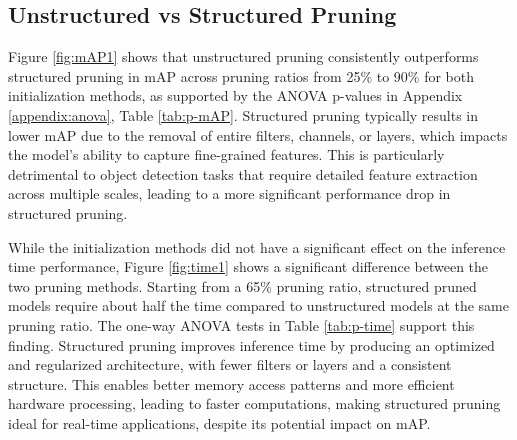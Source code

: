\documentclass[10pt]{cai}
\begin{document}
\subsection{Unstructured vs Structured Pruning}
\label{sec2}
Figure \ref{fig:mAP1} shows that unstructured pruning consistently outperforms structured pruning in mAP across pruning ratios from 25\% to 90\% for both initialization methods, as supported by the ANOVA p-values in Appendix \ref{appendix:anova}, Table \ref{tab:p-mAP}. Structured pruning typically results in lower mAP due to the removal of entire filters, channels, or layers, which impacts the model’s ability to capture fine-grained features. This is particularly detrimental to object detection tasks that require detailed feature extraction across multiple scales, leading to a more significant performance drop in structured pruning.

While the initialization methods did not have a significant effect on the inference time performance, Figure \ref{fig:time1} shows a significant difference between the two pruning methods. Starting from a 65\% pruning ratio, structured pruned models require about half the time compared to unstructured models at the same pruning ratio. The one-way ANOVA tests in Table \ref{tab:p-time} support this finding. Structured pruning improves inference time by producing an optimized and regularized architecture, with fewer filters or layers and a consistent structure. This enables better memory access patterns and more efficient hardware processing, leading to faster computations, making structured pruning ideal for real-time applications, despite its potential impact on mAP.
\end{document}
